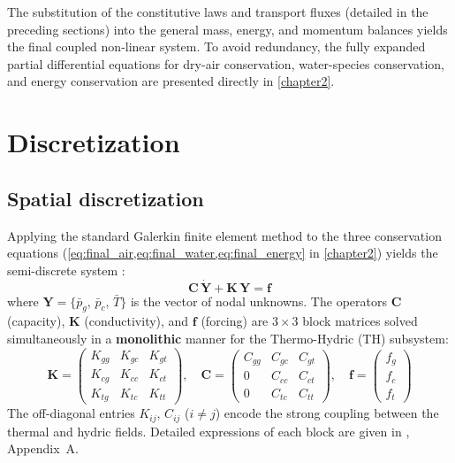 The substitution of the constitutive laws and transport fluxes (detailed in the preceding sections) into the general mass, energy, and momentum balances yields the final coupled non-linear system. To avoid redundancy, the fully expanded partial differential equations for dry-air conservation, water-species conservation, and energy conservation are presented directly in \cref{chapter2}.

\section{Discretization}\label{sec:discretization}

\subsection{Spatial discretization} \label{sec:spatial_discret}
Applying the standard Galerkin finite element method to the three conservation equations (\cref{eq:final_air,eq:final_water,eq:final_energy} in \cref{chapter2}) yields the semi-discrete system \cite{dauti2018}:
\begin{equation}
    \mathbf{C}\,\dot{\mathbf{Y}} + \mathbf{K}\,\mathbf{Y} = \mathbf{f}
    \label{eq:TH_matrix}
\end{equation}
where $\mathbf{Y} = \{\bar{p}_g,\, \bar{p}_c,\, \bar{T}\}$ is the vector of nodal unknowns. The operators $\mathbf{C}$ (capacity), $\mathbf{K}$ (conductivity), and $\mathbf{f}$ (forcing) are $3\times3$ block matrices solved simultaneously in a \textbf{monolithic} manner for the Thermo-Hydric (TH) subsystem:
\begin{equation}
    \mathbf{K} = \begin{pmatrix} K_{gg} & K_{gc} & K_{gt} \\ K_{cg} & K_{cc} & K_{ct} \\ K_{tg} & K_{tc} & K_{tt} \end{pmatrix}, \quad 
    \mathbf{C} = \begin{pmatrix} C_{gg} & C_{gc} & C_{gt} \\ 0      & C_{cc} & C_{ct} \\ 0      & C_{tc} & C_{tt} \end{pmatrix}, \quad 
    \mathbf{f} = \begin{pmatrix} f_g \\ f_c \\ f_t \end{pmatrix}
    \label{eq:TH_blocks}
\end{equation}
The off-diagonal entries $K_{ij}$, $C_{ij}$ ($i\neq j$) encode the strong coupling between the thermal and hydric fields. Detailed expressions of each block are given in \cite{dauti2018}, Appendix~A.


